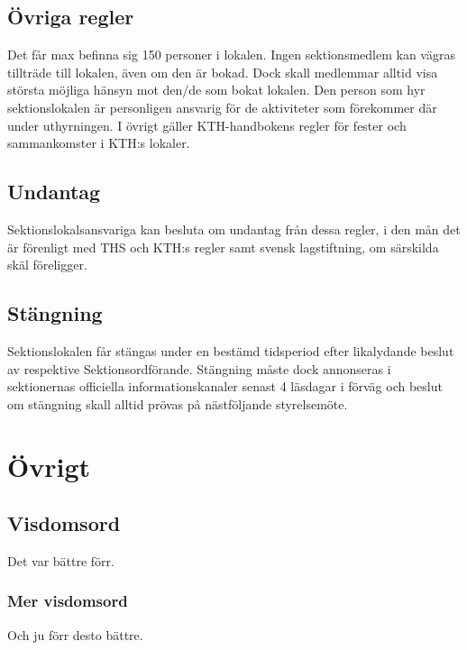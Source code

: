 \documentclass{dgovdoc}
\begin{document}
\subsection{Övriga regler}

Det får max befinna sig 150 personer i lokalen. Ingen sektionsmedlem kan vägras
tillträde till lokalen, även om den är bokad. Dock skall medlemmar alltid visa
största möjliga hänsyn mot den/de som bokat lokalen. Den person som hyr
sektionslokalen är personligen ansvarig för de aktiviteter som förekommer där
under uthyrningen. I övrigt gäller KTH-handbokens regler för fester och
sammankomster i KTH:s lokaler.

\subsection{Undantag}

Sektionslokalsansvariga kan besluta om undantag från dessa regler, i den mån
det är förenligt med THS och KTH:s regler samt svensk lagstiftning, om
särskilda skäl föreligger.

\subsection{Stängning}

Sektionslokalen får stängas under en bestämd tidsperiod efter likalydande
beslut av respektive Sektionsordförande. Stängning måste dock annonseras i
sektionernas officiella informationskanaler senast 4 läsdagar i förväg och
beslut om stängning skall alltid prövas på nästföljande styrelsemöte.

\section{Övrigt}

\subsection{Visdomsord}

Det var bättre förr.

\subsubsection{Mer visdomsord}

Och ju förr desto bättre.
\end{document}
